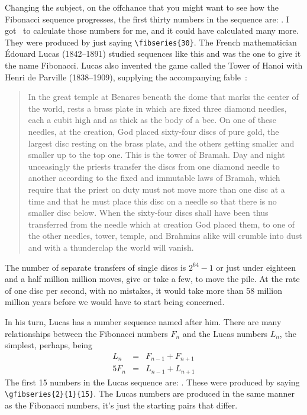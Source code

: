     Changing the subject, on the offchance that you might want to see 
how the Fibonacci sequence
progresses, the first thirty numbers in the sequence are: 
.
I got \ltx\ to calculate those numbers for me, and it could have 
calculated many more. They were produced by just saying \verb?\fibseries{30}?.
The French mathematician 
\'{E}douard Lucas 
(1842--1891) studied sequences
like this and was the one to give it the name Fibonacci. Lucas also
invented the game called the Tower of Hanoi with  
Henri de Parville\protect{} (1838--1909), 
supplying the accompanying fable~\cite{PARVILLE84,ROUSEBALL}:
\begin{quotation}
In the great temple at Benares beneath the dome that marks the center of
the world, rests a brass plate in which are fixed three diamond needles, 
each a cubit high and as thick as the body of a bee. On one of these
needles, at the creation, God placed sixty-four discs of pure gold, the 
largest disc resting on the brass plate, and the others getting smaller 
and smaller up to the top one. This is the tower of Bramah. Day and night
unceasingly the priests transfer the discs from one diamond needle to
another according to the fixed and immutable laws of Bramah, which require
that the priest on duty must not move more than one disc at a time and
that he must place this disc on a needle so that there is no smaller disc
below. When the sixty-four discs shall have been thus transferred from the
needle which at creation God placed them, to one of the other needles, 
tower, temple, and Brahmins alike will crumble into dust and with a
thunderclap the world will vanish.
\end{quotation}

    The number of separate transfers of single discs is $2^{64} - 1$
or just under eighteen and a half million million moves, give or take a few,
to move the pile. At the rate of one disc per second, with no mistakes,
it would take more than 58 million million years before we would have to 
start being concerned.

    In his turn, Lucas has a number sequence named after him. There are many 
relationships between the Fibonacci 
numbers $F_{n}$ and the Lucas numbers $L_{n}$, the simplest, perhaps, being
\begin{eqnarray}
L_{n} & = & F_{n-1} + F_{n+1} \\
5F_{n} & = & L_{n-1} + L_{n+1}
\end{eqnarray}
    The first 15 numbers in the Lucas sequence are:
. These were produced by saying 
\verb?\gfibseries{2}{1}{15}?. The Lucas numbers are produced in the same manner
as the Fibonacci numbers, it's just the starting pairs that differ.

